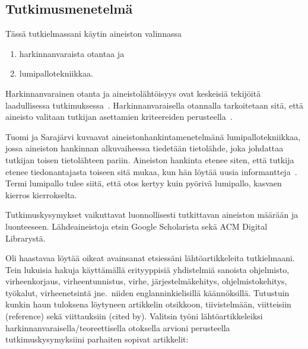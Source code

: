 \documentclass[finnish]{tktltiki2}
\theoremstyle{definition}
\theoremstyle{remark}
\begin{document}
\subsection{Tutkimusmenetelmä}

Tässä tutkielmassani käytin aineiston valinnassa
\begin{enumerate}
  \item harkinnanvaraista otantaa ja
  \item lumipallotekniikkaa.
\end{enumerate}

Harkinnanvarainen otanta ja aineistolähtöisyys ovat keskeisiä tekijöitä laadullisessa tutkimuksessa~\cite[s. 16-20]{laadullinen-tutkimus-ja-sisallonanalyysi}.
Harkinnanvaraisella otannalla tarkoitetaan sitä, että aineisto valitaan tutkijan asettamien kriteereiden perusteella~\cite{aineiston-maara-ja-tutkittavat}.

Tuomi ja Sarajärvi kuvaavat aineistonhankintamenetelmänä lumipallotekniikkaa, jossa aineiston hankinnan alkuvaiheessa tiedetään tietolähde, joka johdattaa tutkijan toisen tietolähteen pariin. Aineiston hankinta etenee siten, että tutkija etenee tiedonantajasta toiseen sitä mukaa, kun hän löytää uusia informantteja~\cite[s. 88]{johdatus-laadulliseen-tutkimukseen}. Termi lumipallo tulee siitä, että otos kertyy kuin pyörivä lumipallo, kasvaen kierros kierrokselta.

Tutkimuskysymykset vaikuttavat luonnollisesti tutkittavan aineiston määrään ja luonteeseen. Lähdeaineistoja etsin Google Scholarista sekä ACM Digital Librarystä.

Oli haastavaa löytää oikeat avainsanat etsiessäni lähtöartikkeleita tutkielmaani. Tein lukuisia hakuja käyttämällä erityyppisiä yhdistelmiä sanoista ohjelmisto, virheenkorjaus, virheentunnistus, virhe, järjestelmäkehitys, ohjelmistokehitys, työkalut, virheenetsintä jne.\ niiden englanninkielisillä käännöksillä. Tutustuin kunkin haun tuloksena löytyneen artikkelin otsikkoon, tiivistelmään, viitteisiin (reference) sekä viittauksiin (cited by). Valitsin työni lähtöartikkeleiksi harkinnanvaraisella/teoreettisella otoksella arvioni perusteella tutkimuskysymyksiini parhaiten sopivat artikkelit:
\end{document}
